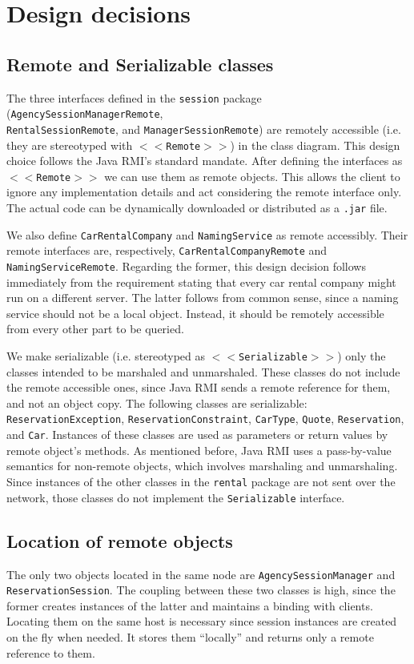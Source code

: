 \section{Design decisions}
\subsection{Remote and Serializable classes}
The three interfaces defined in the \texttt{session} package (\texttt{AgencySessionManagerRemote}, \\\texttt{RentalSessionRemote}, and \texttt{ManagerSessionRemote}) are remotely accessible (i.e. they are stereotyped with \texttt{$<<$Remote$>>$}) in the class diagram. This design choice follows the Java RMI's standard mandate. After defining the interfaces as \texttt{$<<$Remote$>>$} we can use them as remote objects. This allows the client to ignore any implementation details and act considering the remote interface only. The actual code can be dynamically downloaded or distributed as a \texttt{.jar} file.

We also define \texttt{CarRentalCompany} and \texttt{NamingService} as remote accessibly. Their remote interfaces are, respectively, \texttt{CarRentalCompanyRemote} and \texttt{NamingServiceRemote}. Regarding the former, this design decision follows immediately from the requirement stating that every car rental company might run on a different server. The latter follows from common sense, since a naming service should not be a local object. Instead, it should be remotely accessible from every other part to be queried.

We make serializable (i.e. stereotyped as \texttt{$<<$Serializable$>>$}) only the classes intended to be marshaled and unmarshaled. These classes do not include the remote accessible ones, since Java RMI sends a remote reference for them, and not an object copy. The following classes are serializable: \texttt{ReservationException}, \texttt{ReservationConstraint}, \texttt{CarType}, \texttt{Quote}, \texttt{Reservation}, and \texttt{Car}. Instances of these classes are used as parameters or return values by remote object's methods. As mentioned before, Java RMI uses a pass-by-value semantics for non-remote objects, which involves marshaling and unmarshaling. Since instances of the other classes in the \texttt{rental} package are not sent over the network, those classes do not implement the \texttt{Serializable} interface. 

\subsection{Location of remote objects}
The only two objects located in the same node are \texttt{AgencySessionManager} and \texttt{ReservationSession}. The coupling between these two classes is high, since the former creates instances of the latter and maintains a binding with clients. Locating them on the same host is necessary since session instances are created on the fly when needed. It stores them ``locally'' and returns only a remote reference to them. 

